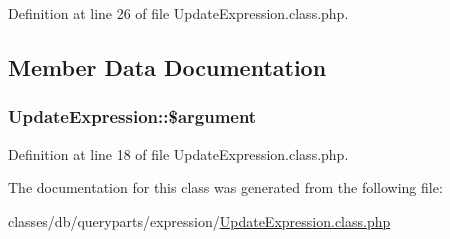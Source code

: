Definition at line 26 of file Update\+Expression.\+class.\+php.



\subsection{Member Data Documentation}
\subsubsection[{\texorpdfstring{\$argument}{$argument}}]{\setlength{\rightskip}{0pt plus 5cm}Update\+Expression\+::\$argument}\hypertarget{classUpdateExpression_a5ad6b27dd8458bfdd8317006ec1c5983}{}\label{classUpdateExpression_a5ad6b27dd8458bfdd8317006ec1c5983}


Definition at line 18 of file Update\+Expression.\+class.\+php.



The documentation for this class was generated from the following file\+:\begin{DoxyCompactItemize}
\item 
classes/db/queryparts/expression/\hyperlink{UpdateExpression_8class_8php}{Update\+Expression.\+class.\+php}\end{DoxyCompactItemize}

